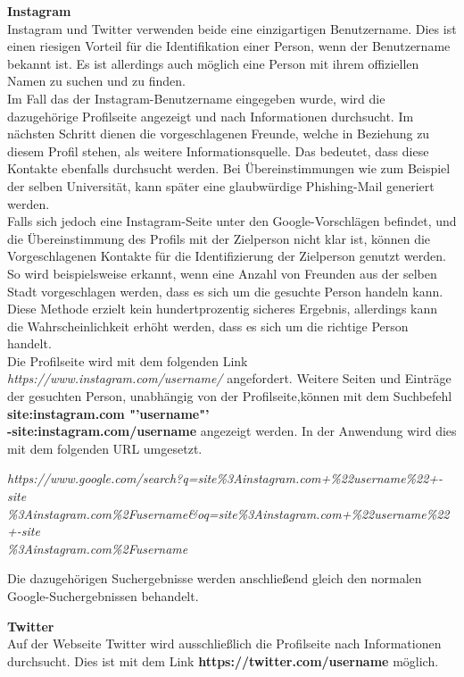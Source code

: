 			\textbf{Instagram}\\
			Instagram und Twitter verwenden beide eine einzigartigen Benutzername. Dies ist einen riesigen Vorteil für die Identifikation einer Person, wenn der Benutzername bekannt ist. Es ist allerdings auch möglich eine Person mit ihrem offiziellen Namen zu suchen und zu finden.\\
			Im Fall das der Instagram-Benutzername eingegeben wurde, wird die dazugehörige Profilseite angezeigt und nach Informationen durchsucht. Im nächsten Schritt dienen die vorgeschlagenen Freunde, welche in Beziehung zu diesem Profil stehen, als weitere Informationsquelle. Das bedeutet, dass diese Kontakte ebenfalls durchsucht werden. Bei Übereinstimmungen wie zum Beispiel der selben Universität, kann später eine glaubwürdige Phishing-Mail generiert werden.\\
			Falls sich jedoch eine Instagram-Seite unter den Google-Vorschlägen befindet, und die Übereinstimmung des Profils mit der Zielperson nicht klar ist, können die Vorgeschlagenen Kontakte für die Identifizierung der Zielperson genutzt werden. So wird beispielsweise erkannt, wenn eine Anzahl von Freunden aus der selben Stadt vorgeschlagen werden, dass es sich um die gesuchte Person handeln kann. Diese Methode erzielt kein hundertprozentig sicheres Ergebnis, allerdings kann die Wahrscheinlichkeit erhöht werden, dass es sich um die richtige Person handelt.\\
			Die Profilseite wird mit dem folgenden Link \textit{https://www.instagram.com/username/} angefordert. Weitere Seiten und Einträge der gesuchten Person, unabhängig von der Profilseite,können mit dem Suchbefehl \textbf{site:instagram.com "'username"' \\ -site:instagram.com/username} angezeigt werden. \cite{Bazzell} In der Anwendung wird dies mit dem folgenden URL umgesetzt.
					
			\textit{https://www.google.com/search?q=site\%3Ainstagram.com+\%22username\%22+-site\\
				\%3Ainstagram.com\%2Fusername\&oq=site\%3Ainstagram.com+\%22username\%22+-site\\
				\%3Ainstagram.com\%2Fusername}
			
			Die dazugehörigen Suchergebnisse werden anschließend gleich den normalen Google-Suchergebnissen behandelt.
			
			\textbf{Twitter}\\
			Auf der Webseite Twitter wird ausschließlich die Profilseite nach Informationen durchsucht. Dies ist mit dem Link \textbf{https://twitter.com/username} möglich.
			
